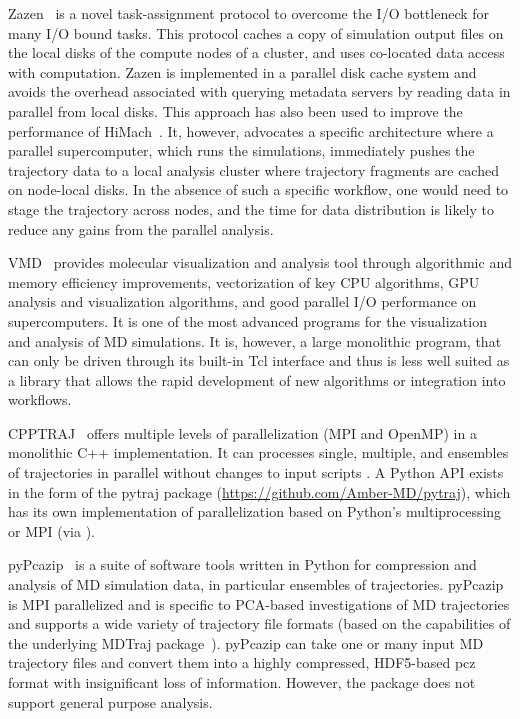 Zazen~\cite{Zazen} is a novel task-assignment protocol to overcome the I/O bottleneck for many I/O bound tasks. This protocol caches a copy of simulation output files on the local disks of the compute nodes of a cluster, and uses co-located data access with computation. 
Zazen is implemented in a parallel disk cache system and avoids the overhead associated with querying metadata servers by reading data in parallel from local disks.
This approach has also been used to improve the performance of HiMach~\cite{himach-2008}.
It, however, advocates a specific architecture where a parallel supercomputer, which runs the simulations, immediately pushes the trajectory data to a local analysis cluster where trajectory fragments are cached on node-local disks.
In the absence of such a specific  workflow, one would need to stage the trajectory across nodes, and the time for data distribution is likely to reduce any gains from the parallel analysis.

VMD~\cite{Hum96, VMD2013} provides molecular visualization and analysis tool through algorithmic and memory efficiency improvements, vectorization of key CPU algorithms, GPU analysis and visualization algorithms, and good parallel I/O performance on supercomputers. It is one of the most advanced programs for the visualization and analysis of MD simulations. It is, however, a large monolithic program, that can only be driven through its built-in Tcl interface and thus is less well suited as a library that allows the rapid development of new algorithms or integration into workflows.

CPPTRAJ~\cite{cpptraj-2013} offers multiple levels of parallelization (MPI and OpenMP) in a monolithic C++ implementation.
It can processes single, multiple, and ensembles of trajectories in parallel without changes to input scripts \cite{Roe:2018aa}. 
A Python API exists in the form of the pytraj package (\url{https://github.com/Amber-MD/pytraj}), which has its own implementation of parallelization based on Python's multiprocessing or MPI (via  \cite{Dalcin:2011aa, Dalcin:2005aa}).

pyPcazip~\cite{pyPcazip} is a suite of software tools written in Python for compression and analysis of MD simulation data, in particular ensembles of trajectories. 
pyPcazip is MPI parallelized and is specific to PCA-based investigations of MD trajectories and supports a wide variety of trajectory file formats (based on the capabilities of the underlying MDTraj package~\cite{McGibbon:2015aa}).
pyPcazip can take one or many input MD trajectory files and convert them into a highly compressed, HDF5-based pcz format with insignificant loss of information.
However, the package does not support general purpose analysis.

